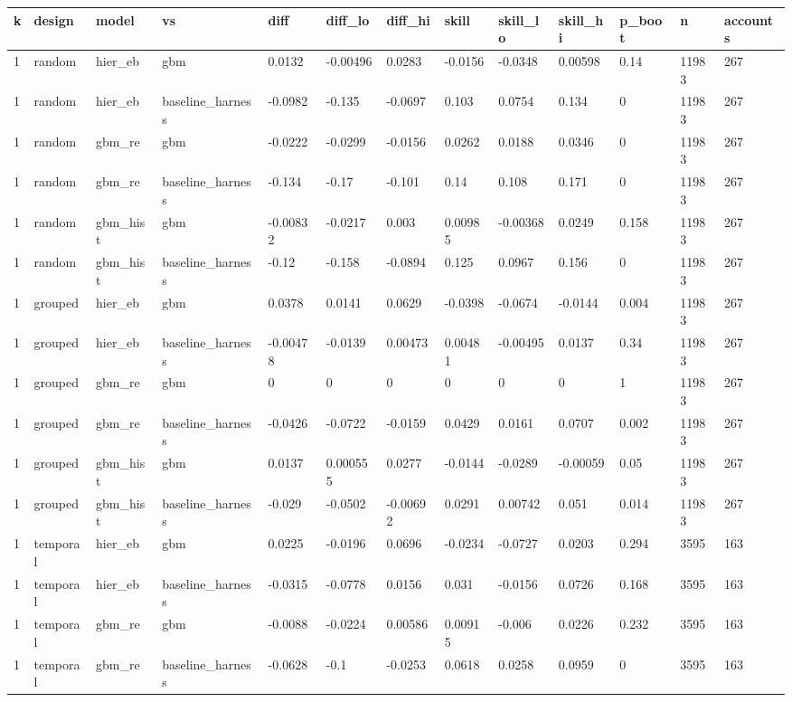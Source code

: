 \begin{tabular}{lllllllllllll}
\toprule
k & design & model & vs & diff & diff\_lo & diff\_hi & skill & skill\_lo & skill\_hi & p\_boot & n & accounts \\
\midrule
1 & random & hier\_eb & gbm & 0.0132 & -0.00496 & 0.0283 & -0.0156 & -0.0348 & 0.00598 & 0.14 & 11983 & 267 \\
1 & random & hier\_eb & baseline\_harness & -0.0982 & -0.135 & -0.0697 & 0.103 & 0.0754 & 0.134 & 0 & 11983 & 267 \\
1 & random & gbm\_re & gbm & -0.0222 & -0.0299 & -0.0156 & 0.0262 & 0.0188 & 0.0346 & 0 & 11983 & 267 \\
1 & random & gbm\_re & baseline\_harness & -0.134 & -0.17 & -0.101 & 0.14 & 0.108 & 0.171 & 0 & 11983 & 267 \\
1 & random & gbm\_hist & gbm & -0.00832 & -0.0217 & 0.003 & 0.00985 & -0.00368 & 0.0249 & 0.158 & 11983 & 267 \\
1 & random & gbm\_hist & baseline\_harness & -0.12 & -0.158 & -0.0894 & 0.125 & 0.0967 & 0.156 & 0 & 11983 & 267 \\
1 & grouped & hier\_eb & gbm & 0.0378 & 0.0141 & 0.0629 & -0.0398 & -0.0674 & -0.0144 & 0.004 & 11983 & 267 \\
1 & grouped & hier\_eb & baseline\_harness & -0.00478 & -0.0139 & 0.00473 & 0.00481 & -0.00495 & 0.0137 & 0.34 & 11983 & 267 \\
1 & grouped & gbm\_re & gbm & 0 & 0 & 0 & 0 & 0 & 0 & 1 & 11983 & 267 \\
1 & grouped & gbm\_re & baseline\_harness & -0.0426 & -0.0722 & -0.0159 & 0.0429 & 0.0161 & 0.0707 & 0.002 & 11983 & 267 \\
1 & grouped & gbm\_hist & gbm & 0.0137 & 0.000555 & 0.0277 & -0.0144 & -0.0289 & -0.00059 & 0.05 & 11983 & 267 \\
1 & grouped & gbm\_hist & baseline\_harness & -0.029 & -0.0502 & -0.00692 & 0.0291 & 0.00742 & 0.051 & 0.014 & 11983 & 267 \\
1 & temporal & hier\_eb & gbm & 0.0225 & -0.0196 & 0.0696 & -0.0234 & -0.0727 & 0.0203 & 0.294 & 3595 & 163 \\
1 & temporal & hier\_eb & baseline\_harness & -0.0315 & -0.0778 & 0.0156 & 0.031 & -0.0156 & 0.0726 & 0.168 & 3595 & 163 \\
1 & temporal & gbm\_re & gbm & -0.0088 & -0.0224 & 0.00586 & 0.00915 & -0.006 & 0.0226 & 0.232 & 3595 & 163 \\
1 & temporal & gbm\_re & baseline\_harness & -0.0628 & -0.1 & -0.0253 & 0.0618 & 0.0258 & 0.0959 & 0 & 3595 & 163 \\

\end{tabular}
